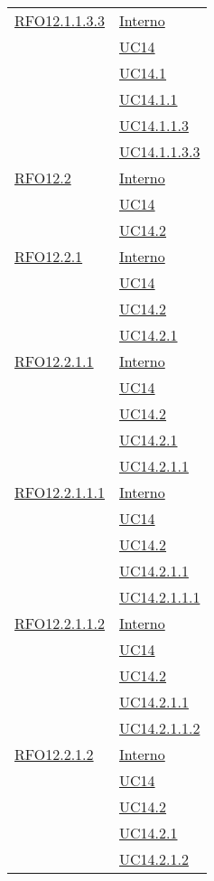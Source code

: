 \begin{longtable}{|>{\centering}m{5cm}|m{5cm}<{\centering}|}
 \hyperlink{RFO12.1.1.3.3}{RFO12.1.1.3.3} 
 & \hyperlink{Interno}{Interno}\\
& \hyperref[UC14]{UC14}\\
& \hyperref[UC14.1]{UC14.1}\\
& \hyperref[UC14.1.1]{UC14.1.1}\\
& \hyperref[UC14.1.1.3]{UC14.1.1.3}\\
& \hyperref[UC14.1.1.3.3]{UC14.1.1.3.3}\\\hline

 \hyperlink{RFO12.2}{RFO12.2} 
 & \hyperlink{Interno}{Interno}\\
& \hyperref[UC14]{UC14}\\
& \hyperref[UC14.2]{UC14.2}\\\hline

 \hyperlink{RFO12.2.1}{RFO12.2.1} 
 & \hyperlink{Interno}{Interno}\\
& \hyperref[UC14]{UC14}\\
& \hyperref[UC14.2]{UC14.2}\\
& \hyperref[UC14.2.1]{UC14.2.1}\\\hline

\hyperlink{RFO12.2.1.1}{RFO12.2.1.1} 
 & \hyperlink{Interno}{Interno}\\
& \hyperref[UC14]{UC14}\\
& \hyperref[UC14.2]{UC14.2}\\
& \hyperref[UC14.2.1]{UC14.2.1}\\
& \hyperref[UC14.2.1.1]{UC14.2.1.1}\\\hline

\hyperlink{RFO12.2.1.1.1}{RFO12.2.1.1.1} 
 & \hyperlink{Interno}{Interno}\\
& \hyperref[UC14]{UC14}\\
& \hyperref[UC14.2]{UC14.2}\\
& \hyperref[UC14.2.1.1]{UC14.2.1.1}\\
& \hyperref[UC14.2.1.1.1]{UC14.2.1.1.1}\\\hline

\hyperlink{RFO12.2.1.1.2}{RFO12.2.1.1.2} 
 & \hyperlink{Interno}{Interno}\\
& \hyperref[UC14]{UC14}\\
& \hyperref[UC14.2]{UC14.2}\\
& \hyperref[UC14.2.1.1]{UC14.2.1.1}\\
& \hyperref[UC14.2.1.1.2]{UC14.2.1.1.2}\\\hline

 \hyperlink{RFO12.2.1.2}{RFO12.2.1.2} 
 & \hyperlink{Interno}{Interno}\\
& \hyperref[UC14]{UC14}\\
& \hyperref[UC14.2]{UC14.2}\\
& \hyperref[UC14.2.1]{UC14.2.1}\\
& \hyperref[UC14.2.1.2]{UC14.2.1.2}\\\hline


\end{longtable}
